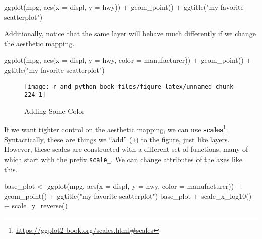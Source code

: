\documentclass[
  12pt,
  krantz2]{krantz}
\makeatletter
\newenvironment{Shaded}{\begin{snugshade}}{\end{snugshade}}
\newcommand{\AttributeTok}[1]{\textcolor[rgb]{0.61,0.61,0.61}{#1}}
\newcommand{\FunctionTok}[1]{\textcolor[rgb]{0,0,0}{#1}}
\newcommand{\NormalTok}[1]{#1}
\newcommand{\OtherTok}[1]{\textcolor[rgb]{0.37,0.37,0.37}{#1}}
\newcommand{\SpecialCharTok}[1]{\textcolor[rgb]{0,0,0}{#1}}
\newcommand{\StringTok}[1]{\textcolor[rgb]{0.5,0.5,0.5}{#1}}
\renewcommand{\href}[2]{#2\footnote{\url{#1}}}
\newenvironment{kframe}{%
\medskip{}
\setlength{\fboxsep}{.8em}
 \def\at@end@of@kframe{}%
 \ifinner\ifhmode%
  \def\at@end@of@kframe{\end{minipage}}%
  \begin{minipage}{\columnwidth}%
 \fi\fi%
 \def\FrameCommand##1{\hskip\@totalleftmargin \hskip-\fboxsep
 \colorbox{shadecolor}{##1}\hskip-\fboxsep
     \hskip-\linewidth \hskip-\@totalleftmargin \hskip\columnwidth}%
 \MakeFramed {\advance\hsize-\width
   \@totalleftmargin\z@ \linewidth\hsize
   \@setminipage}}%
 {\par\unskip\endMakeFramed%
 \at@end@of@kframe}
\renewenvironment{Shaded}{\begin{kframe}}{\end{kframe}}
\makeatother
\begin{document}
\begin{Shaded}
\begin{Highlighting}[]
\FunctionTok{ggplot}\NormalTok{(mpg, }\FunctionTok{aes}\NormalTok{(}\AttributeTok{x =}\NormalTok{ displ, }\AttributeTok{y =}\NormalTok{ hwy))  }\SpecialCharTok{+}
  \FunctionTok{geom\_point}\NormalTok{() }\SpecialCharTok{+} 
  \FunctionTok{ggtitle}\NormalTok{(}\StringTok{"my favorite scatterplot"}\NormalTok{)}
\end{Highlighting}
\end{Shaded}

Additionally, notice that the same layer will behave much differently if we change the aesthetic mapping.

\begin{Shaded}
\begin{Highlighting}[]
\FunctionTok{ggplot}\NormalTok{(mpg, }\FunctionTok{aes}\NormalTok{(}\AttributeTok{x =}\NormalTok{ displ, }\AttributeTok{y =}\NormalTok{ hwy, }\AttributeTok{color =}\NormalTok{ manufacturer))  }\SpecialCharTok{+}
  \FunctionTok{geom\_point}\NormalTok{() }\SpecialCharTok{+} 
  \FunctionTok{ggtitle}\NormalTok{(}\StringTok{"my favorite scatterplot"}\NormalTok{)}
\end{Highlighting}
\end{Shaded}

\begin{figure}

{\centering \texttt{[image: r\_and\_python\_book\_files/figure-latex/unnamed-chunk-224-1]} 

}

\caption{Adding Some Color}\label{fig:unnamed-chunk-224}
\end{figure}

If we want tighter control on the aesthetic mapping, we can use \href{https://ggplot2-book.org/scales.html\#scales}{\textbf{scales}}. Syntactically, these are things we ``add'' (\texttt{+}) to the figure, just like layers. However, these scales are constructed with a different set of functions, many of which start with the prefix \texttt{scale\_}. We can change attributes of the axes like this.

\begin{Shaded}
\begin{Highlighting}[]
\NormalTok{base\_plot }\OtherTok{\textless{}{-}} \FunctionTok{ggplot}\NormalTok{(mpg, }
                    \FunctionTok{aes}\NormalTok{(}\AttributeTok{x =}\NormalTok{ displ, }\AttributeTok{y =}\NormalTok{ hwy, }\AttributeTok{color =}\NormalTok{ manufacturer)) }\SpecialCharTok{+}
             \FunctionTok{geom\_point}\NormalTok{() }\SpecialCharTok{+} 
             \FunctionTok{ggtitle}\NormalTok{(}\StringTok{"my favorite scatterplot"}\NormalTok{)}
\NormalTok{base\_plot }\SpecialCharTok{+} \FunctionTok{scale\_x\_log10}\NormalTok{() }\SpecialCharTok{+} \FunctionTok{scale\_y\_reverse}\NormalTok{()}
\end{Highlighting}
\end{Shaded}
\end{document}
